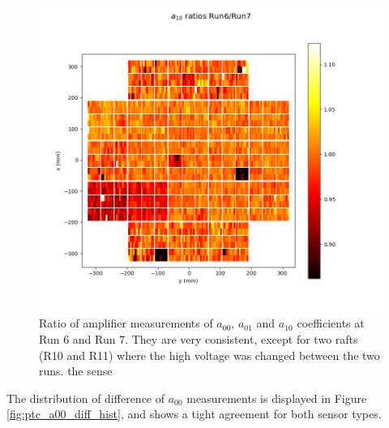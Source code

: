 \begin{figure}[H]
\begin{centering}
  \includegraphics[width=\linewidth]{figures/baselineCharacterization/a10_ratios.png}
  \endminipage\hfill
  

\caption{Ratio of amplifier measurements of $a_{00}$, $a_{01}$ and $a_{10}$ coefficients at Run 6 and Run 7. They are very consistent, except for two rafts (R10 and R11) where the high voltage was changed between the two runs. the sense \label{fig:ratio_bf_coeff_6_7}}
  \end{centering}
  \end{figure}

The distribution of difference of $a_{00}$ measurements is displayed in Figure \ref{fig:ptc_a00_diff_hist}, and shows a tight agreement for both sensor types.

